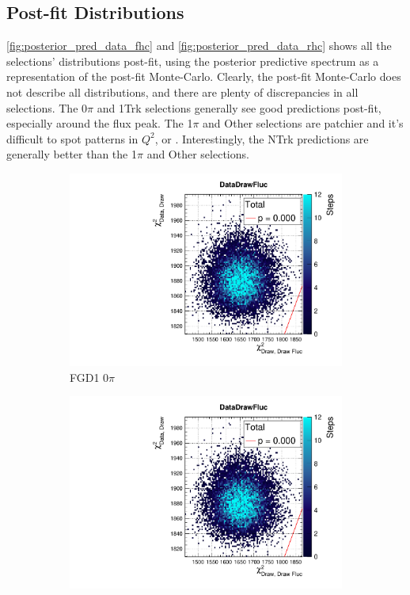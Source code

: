 \subsection{Post-fit Distributions}
\autoref{fig:posterior_pred_data_fhc} and \autoref{fig:posterior_pred_data_rhc} shows all the selections' \pmu \cosmu distributions post-fit, using the posterior predictive spectrum as a representation of the post-fit Monte-Carlo. Clearly, the post-fit Monte-Carlo does not describe all distributions, and there are plenty of discrepancies in all selections. The 0$\pi$ and 1Trk selections generally see good predictions post-fit, especially around the flux peak. The 1$\pi$ and Other selections are patchier and it's difficult to spot patterns in $Q^2$, \pmu or \cosmu. Interestingly, the NTrk predictions are generally better than the 1$\pi$ and Other selections.
\begin{figure}[h]
	\begin{subfigure}[t]{0.32\textwidth}
		\includegraphics[width=\textwidth, trim={20mm 6mm 4mm 11mm}, clip,page=5]{figures/mach3/data/postpred/2017b_NewData_NewDet_UpdXsecStep_2Xsec_4Det_5Flux_0_PostPred_procs}
		\caption{FGD1 0$\pi$}
	\end{subfigure}
	\begin{subfigure}[t]{0.32\textwidth}
		\includegraphics[width=\textwidth, trim={20mm 6mm 4mm 11mm}, clip,page=14]{figures/mach3/data/postpred/2017b_NewData_NewDet_UpdXsecStep_2Xsec_4Det_5Flux_0_PostPred_procs}

\end{subfigure}
\end{figure}
